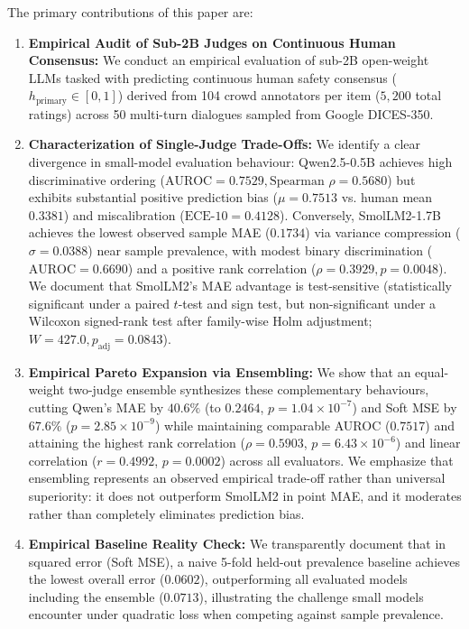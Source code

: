 The primary contributions of this paper are:
\begin{enumerate}
    \item \textbf{Empirical Audit of Sub-2B Judges on Continuous Human Consensus:} We conduct an empirical evaluation of sub-2B open-weight LLMs tasked with predicting continuous human safety consensus ($h_{\text{primary}} \in [0, 1]$) derived from 104 crowd annotators per item ($5,200$ total ratings) across 50 multi-turn dialogues sampled from Google DICES-350.
    \item \textbf{Characterization of Single-Judge Trade-Offs:} We identify a clear divergence in small-model evaluation behaviour: Qwen2.5-0.5B achieves high discriminative ordering ($\text{AUROC} = 0.7529, \text{Spearman } \rho = 0.5680$) but exhibits substantial positive prediction bias ($\mu = 0.7513$ vs. human mean $0.3381$) and miscalibration ($\text{ECE-10} = 0.4128$). Conversely, SmolLM2-1.7B achieves the lowest observed sample MAE ($0.1734$) via variance compression ($\sigma = 0.0388$) near sample prevalence, with modest binary discrimination ($\text{AUROC} = 0.6690$) and a positive rank correlation ($\rho = 0.3929, p = 0.0048$). We document that SmolLM2's MAE advantage is test-sensitive (statistically significant under a paired $t$-test and sign test, but non-significant under a Wilcoxon signed-rank test after family-wise Holm adjustment; $W = 427.0, p_{\text{adj}} = 0.0843$).
    \item \textbf{Empirical Pareto Expansion via Ensembling:} We show that an equal-weight two-judge ensemble synthesizes these complementary behaviours, cutting Qwen's MAE by $40.6\%$ (to $0.2464$, $p = 1.04 \times 10^{-7}$) and Soft MSE by $67.6\%$ ($p = 2.85 \times 10^{-9}$) while maintaining comparable AUROC ($0.7517$) and attaining the highest rank correlation ($\rho = \mathbf{0.5903}$, $p = 6.43 \times 10^{-6}$) and linear correlation ($r = \mathbf{0.4992}$, $p = 0.0002$) across all evaluators. We emphasize that ensembling represents an observed empirical trade-off rather than universal superiority: it does not outperform SmolLM2 in point MAE, and it moderates rather than completely eliminates prediction bias.
    \item \textbf{Empirical Baseline Reality Check:} We transparently document that in squared error (Soft MSE), a naive 5-fold held-out prevalence baseline achieves the lowest overall error ($0.0602$), outperforming all evaluated models including the ensemble ($0.0713$), illustrating the challenge small models encounter under quadratic loss when competing against sample prevalence.

\end{enumerate}
